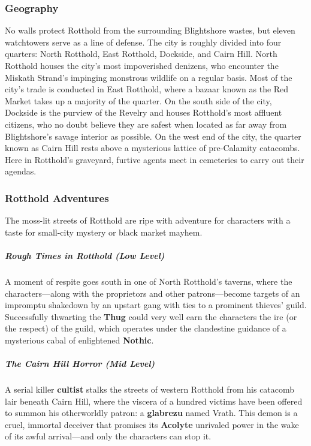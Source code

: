 \documentclass[10pt,a4paper,twoside,bg=print,twocolumn,openany,nodeprecatedcode]{dndbook}
\begin{document}
\subsubsection{Geography}
No walls protect Rotthold from the surrounding Blightshore wastes, but eleven watchtowers serve as a line of defense. The city is roughly divided into four quarters: North Rotthold, East Rotthold, Dockside, and Cairn Hill. North Rotthold houses the city's most impoverished denizens, who encounter the Miskath Strand's impinging monstrous wildlife on a regular basis. Most of the city's trade is conducted in East Rotthold, where a bazaar known as the Red Market takes up a majority of the quarter. On the south side of the city, Dockside is the purview of the Revelry and houses Rotthold's most affluent citizens, who no doubt believe they are safest when located as far away from Blightshore's savage interior as possible. On the west end of the city, the quarter known as Cairn Hill rests above a mysterious lattice of pre-Calamity catacombs. Here in Rotthold's graveyard, furtive agents meet in cemeteries to carry out their agendas.

\subsubsection{Rotthold Adventures}
The moss-lit streets of Rotthold are ripe with adventure for characters with a taste for small-city mystery or black market mayhem.

\subparagraph{Rough Times in Rotthold (Low Level)}
A moment of respite goes south in one of North Rotthold's taverns, where the characters—along with the proprietors and other patrons—become targets of an impromptu shakedown by an upstart gang with ties to a prominent thieves' guild. Successfully thwarting the \textbf{Thug} could very well earn the characters the ire (or the respect) of the guild, which operates under the clandestine guidance of a mysterious cabal of enlightened \textbf{Nothic}.

\subparagraph{The Cairn Hill Horror (Mid Level)}
A serial killer \textbf{cultist} stalks the streets of western Rotthold from his catacomb lair beneath Cairn Hill, where the viscera of a hundred victims have been offered to summon his otherworldly patron: a \textbf{glabrezu} named Vrath. This demon is a cruel, immortal deceiver that promises its \textbf{Acolyte} unrivaled power in the wake of its awful arrival—and only the characters can stop it.
\end{document}
